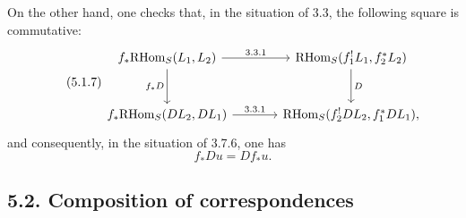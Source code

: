 \documentclass[11pt]{article}
\providecommand{\RHom}{\mathrm{RHom}}
\providecommand{\RHom}{\mathrm{RHom}}
\providecommand{\RHom}{\mathrm R\mathcal{H}om}
\begin{document}
On the other hand, one checks that, in the situation of 3.3, the following square is commutative:
\begin{equation}
\tag{5.1.7}
\begin{tikzcd}[column sep=large,row sep=large]
f_*\RHom_S(L_1,L_2) \arrow[r,"3.3.1"] \arrow[d,"f_*D"']
& \RHom_S(f_1^!L_1,f_2^*L_2) \arrow[d,"D"] \\
f_*\RHom_S(DL_2,DL_1) \arrow[r,"3.3.1"]
& \RHom_S(f_2^!DL_2,f_1^*DL_1),
\end{tikzcd}
\end{equation}
and consequently, in the situation of 3.7.6, one has
\begin{equation}
\tag{5.1.8}
f_*Du=Df_*u.
\end{equation}

\subsection*{5.2. Composition of correspondences}
\end{document}
